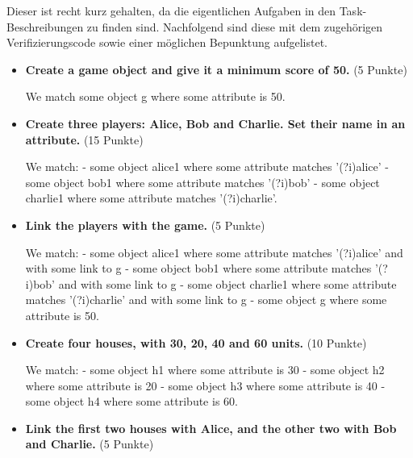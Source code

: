 Dieser ist recht kurz gehalten, da die eigentlichen Aufgaben in den Task-Beschreibungen zu finden sind.
Nachfolgend sind diese mit dem zugehörigen Verifizierungscode sowie einer möglichen Bepunktung aufgelistet.

\begin{itemize}
    \item \textbf{Create a game object and give it a minimum score of 50.} (5 Punkte)

    \begin{mdcodeblock}
        We match some object g where some attribute is 50.
    \end{mdcodeblock}

    \item \textbf{Create three players: Alice, Bob and Charlie.
    Set their name in an attribute.} (15 Punkte)

    \begin{mdcodeblock}
        We match:
        - some object alice1 where some attribute matches '(?i)alice'
        - some object bob1 where some attribute matches '(?i)bob'
        - some object charlie1 where some attribute matches '(?i)charlie'.
    \end{mdcodeblock}

    \item \textbf{Link the players with the game.} (5 Punkte)

    \begin{mdcodeblock}
        We match:
        - some object alice1 where some attribute matches '(?i)alice' and with some link to g
        - some object bob1 where some attribute matches '(?i)bob' and with some link to g
        - some object charlie1 where some attribute matches '(?i)charlie' and with some link to g
        - some object g where some attribute is 50.
    \end{mdcodeblock}

    \item \textbf{Create four houses, with 30, 20, 40 and 60 units.} (10 Punkte)

    \begin{mdcodeblock}
        We match:
        - some object h1 where some attribute is 30
        - some object h2 where some attribute is 20
        - some object h3 where some attribute is 40
        - some object h4 where some attribute is 60.
    \end{mdcodeblock}

    \item \textbf{Link the first two houses with Alice, and the other two with Bob and Charlie.} (5 Punkte)


\end{itemize}
